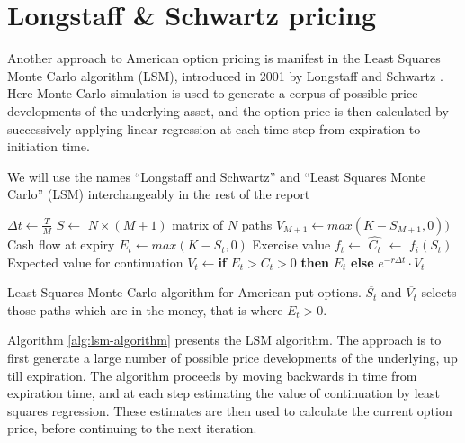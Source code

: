 \section{Longstaff \& Schwartz pricing}
Another approach to American option pricing is manifest in the Least
Squares Monte Carlo algorithm (LSM), introduced in 2001 by Longstaff and
Schwartz \cite{longstaff2001valuing}. Here Monte Carlo
simulation is used to generate a corpus of possible price developments
of the underlying asset, and the option price is then calculated by
successively applying linear regression at each time step from
expiration to initiation time.

We will use the names ``Longstaff and Schwartz'' and ``Least Squares
Monte Carlo'' (LSM) interchangeably in the rest of the report


\begin{algorithm}
  \begin{algorithmic}
    \State $\Delta t \gets \frac{T}{M}$
    \State $S \gets$ 
    \State \Comment $N \times (M+1)$ matrix of $N$ paths
    \State $V_{M+1} \gets max(K-S_{M+1}, 0))$ \Comment Cash flow at expiry
    \State $E_t \gets max(K-S_t, 0)$ \Comment Exercise value
    \State $f_t \gets$  %
    \State $\hat{C_t}$ $\gets$ $f_i(S_t)$ \Comment Expected value for continuation
    \State $V_t \gets $\textbf{if} $E_t > C_t > 0$ \textbf{then} $E_t$ \textbf{else} $e^{-r\Delta t}\cdot V_t$
    \EndFor
    \EndFunction
  \end{algorithmic}
  \vspace{2mm}
  \caption{Least Squares Monte Carlo algorithm for American put
    options. $\overline{S_t}$ and $\overline{V_t}$ selects those paths
    which are in the money, that is where $E_t > 0$.}
  \label{alg:lsm-algorithm}
\end{algorithm}

Algorithm \ref{alg:lsm-algorithm} presents the LSM algorithm.  The
approach is to first generate a large number of possible price
developments of the underlying, up till expiration. The algorithm
proceeds by moving backwards in time from expiration time, and at each
step estimating the value of continuation by least squares
regression. These estimates are then used to calculate the current
option price, before continuing to the next iteration.

